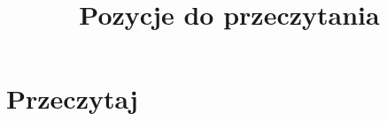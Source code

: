 \documentclass[a4paper,11pt]{article}
\title{Pozycje do przeczytania}
\begin{document}





\maketitle  %





\section{Przeczytaj}

\vspace{2em}
\end{document}
